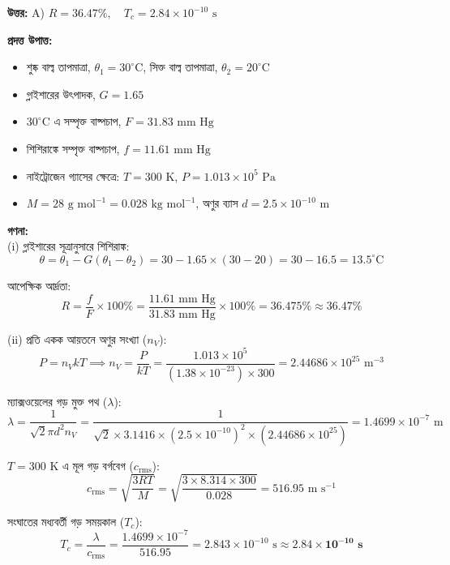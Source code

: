\documentclass[12pt, a4paper]{article}
\begin{document}
\vspace{0.5em}
\begin{tcolorbox}[answerbox]
    \textbf{\color{success} উত্তর:} A) $R = 36.47\%, \quad T_c = 2.84 \times 10^{-10}\text{ s}$
\end{tcolorbox}
\vspace{1em}

\begin{tcolorbox}[solutionbox={সমাধান (Solution)}]
    \noindent
    \textbf{প্রদত্ত উপাত্ত:}
    \begin{itemize}[leftmargin=1.5em, itemsep=0.2em]
        \item শুষ্ক বাল্ব তাপমাত্রা, $\theta_1 = 30^\circ\text{C}$, সিক্ত বাল্ব তাপমাত্রা, $\theta_2 = 20^\circ\text{C}$
        \item গ্লাইশারের উৎপাদক, $G = 1.65$
        \item $30^\circ\text{C}$ এ সম্পৃক্ত বাষ্পচাপ, $F = 31.83\text{ mm Hg}$
        \item শিশিরাঙ্কে সম্পৃক্ত বাষ্পচাপ, $f = 11.61\text{ mm Hg}$
        \item নাইট্রোজেন গ্যাসের ক্ষেত্রে: $T = 300\text{ K}$, $P = 1.013 \times 10^5\text{ Pa}$
        \item $M = 28\text{ g mol}^{-1} = 0.028\text{ kg mol}^{-1}$, অণুর ব্যাস $d = 2.5 \times 10^{-10}\text{ m}$
    \end{itemize}

    \vspace{0.6em}
    \noindent\textbf{গণনা:} \\
    (i) গ্লাইশারের সূত্রানুসারে শিশিরাঙ্ক:
    \[ \theta = \theta_1 - G(\theta_1 - \theta_2) = 30 - 1.65 \times (30 - 20) = 30 - 16.5 = 13.5^\circ\text{C} \]
    
    আপেক্ষিক আর্দ্রতা:
    \[ R = \frac{f}{F} \times 100\% = \frac{11.61\text{ mm Hg}}{31.83\text{ mm Hg}} \times 100\% = 36.475\% \approx \mathbf{36.47\%} \]
    
    (ii) প্রতি একক আয়তনে অণুর সংখ্যা ($n_V$):
    \[ P = n_V k T \implies n_V = \frac{P}{k T} = \frac{1.013 \times 10^5}{(1.38 \times 10^{-23}) \times 300} = 2.44686 \times 10^{25}\text{ m}^{-3} \]
    
    ম্যাক্সওয়েলের গড় মুক্ত পথ ($\lambda$):
    \[ \lambda = \frac{1}{\sqrt{2} \pi d^2 n_V} = \frac{1}{\sqrt{2} \times 3.1416 \times (2.5 \times 10^{-10})^2 \times (2.44686 \times 10^{25})} = 1.4699 \times 10^{-7}\text{ m} \]
    
    $T = 300\text{ K}$ এ মূল গড় বর্গবেগ ($c_{\text{rms}}$):
    \[ c_{\text{rms}} = \sqrt{\frac{3 R T}{M}} = \sqrt{\frac{3 \times 8.314 \times 300}{0.028}} = 516.95\text{ m s}^{-1} \]
    
    সংঘাতের মধ্যবর্তী গড় সময়কাল ($T_c$):
    \[ T_c = \frac{\lambda}{c_{\text{rms}}} = \frac{1.4699 \times 10^{-7}}{516.95} = 2.843 \times 10^{-10}\text{ s} \approx \mathbf{2.84 \times 10^{-10}\text{ s}} \]
\end{tcolorbox}
\end{document}
